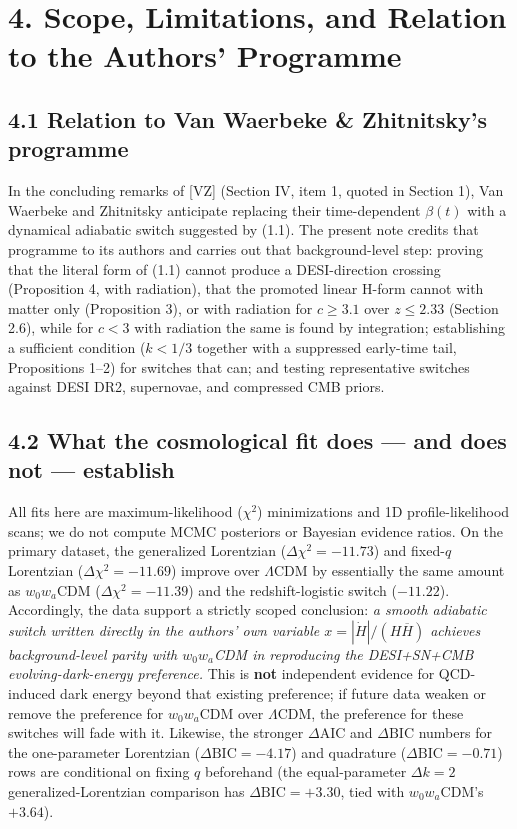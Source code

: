 \documentclass[11pt,a4paper]{article}
\begin{document}
\section*{4. Scope, Limitations, and Relation to the Authors' Programme}

\subsection*{4.1 Relation to Van Waerbeke \& Zhitnitsky's programme}
In the concluding remarks of [VZ] (Section IV, item 1, quoted in Section 1), Van Waerbeke and Zhitnitsky anticipate replacing their time-dependent $\beta(t)$ with a dynamical adiabatic switch suggested by (1.1). The present note credits that programme to its authors and carries out that background-level step: proving that the literal form of (1.1) cannot produce a DESI-direction crossing (Proposition 4, with radiation), that the promoted linear H-form cannot with matter only (Proposition 3), or with radiation for $c \ge 3.1$ over $z \le 2.33$ (Section 2.6), while for $c < 3$ with radiation the same is found by integration; establishing a sufficient condition ($k < 1/3$ together with a suppressed early-time tail, Propositions 1--2) for switches that can; and testing representative switches against DESI DR2, supernovae, and compressed CMB priors.


\subsection*{4.2 What the cosmological fit does --- and does not --- establish}
All fits here are maximum-likelihood ($\chi^2$) minimizations and 1D profile-likelihood scans; we do not compute MCMC posteriors or Bayesian evidence ratios. On the primary dataset, the generalized Lorentzian ($\Delta\chi^2 = -11.73$) and fixed-$q$ Lorentzian ($\Delta\chi^2 = -11.69$) improve over $\Lambda$CDM by essentially the same amount as $w_0 w_a$CDM ($\Delta\chi^2 = -11.39$) and the redshift-logistic switch ($-11.22$). Accordingly, the data support a strictly scoped conclusion: \emph{a smooth adiabatic switch written directly in the authors' own variable $x = |\dot{H}|/(H\overline{H})$ achieves background-level parity with $w_0 w_a$CDM in reproducing the DESI+SN+CMB evolving-dark-energy preference.} This is {\bfseries\boldmath not} independent evidence for QCD-induced dark energy beyond that existing preference; if future data weaken or remove the preference for $w_0 w_a$CDM over $\Lambda$CDM, the preference for these switches will fade with it. Likewise, the stronger $\Delta\text{AIC}$ and $\Delta\text{BIC}$ numbers for the one-parameter Lorentzian ($\Delta\text{BIC} = -4.17$) and quadrature ($\Delta\text{BIC} = -0.71$) rows are conditional on fixing $q$ beforehand (the equal-parameter $\Delta k = 2$ generalized-Lorentzian comparison has $\Delta\text{BIC} = +3.30$, tied with $w_0 w_a$CDM's $+3.64$).
\end{document}
